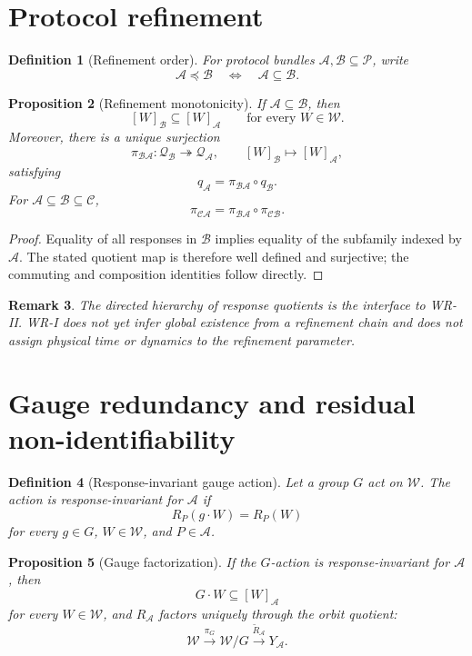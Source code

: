 \documentclass[11pt]{article}
\newtheorem{definition}{Definition}[section]
\newtheorem{proposition}[definition]{Proposition}
\newtheorem{remark}[definition]{Remark}
\newcommand{\W}{\mathcal W}
\newcommand{\Pcal}{\mathcal P}
\newcommand{\Acal}{\mathcal A}
\newcommand{\Bcal}{\mathcal B}
\begin{document}
\section{Protocol refinement}

\begin{definition}[Refinement order]
For protocol bundles $\Acal,\Bcal\subseteq\Pcal$, write
\[
\Acal\preceq\Bcal
\quad\Longleftrightarrow\quad
\Acal\subseteq\Bcal.
\]
\end{definition}

\begin{proposition}[Refinement monotonicity]\label{prop:refinement}
If $\Acal\subseteq\Bcal$, then
\[
[W]_{\Bcal}\subseteq[W]_{\Acal}
\qquad\text{for every }W\in\W.
\]
Moreover, there is a unique surjection
\[
\pi_{\Bcal\Acal}:\mathcal Q_{\Bcal}\twoheadrightarrow\mathcal Q_{\Acal},
\qquad
[W]_{\Bcal}\mapsto[W]_{\Acal},
\]
satisfying
\[
q_{\Acal}=\pi_{\Bcal\Acal}\circ q_{\Bcal}.
\]
For $\Acal\subseteq\Bcal\subseteq\mathcal C$,
\[
\pi_{\mathcal C\Acal}
=
\pi_{\Bcal\Acal}\circ\pi_{\mathcal C\Bcal}.
\]
\end{proposition}

\begin{proof}
Equality of all responses in $\Bcal$ implies equality of the subfamily indexed
by $\Acal$. The stated quotient map is therefore well defined and surjective;
the commuting and composition identities follow directly.
\end{proof}

\begin{remark}
The directed hierarchy of response quotients is the interface to WR-II. WR-I
does not yet infer global existence from a refinement chain and does not assign
physical time or dynamics to the refinement parameter.
\end{remark}

\section{Gauge redundancy and residual non-identifiability}

\begin{definition}[Response-invariant gauge action]
Let a group $G$ act on $\W$. The action is response-invariant for $\Acal$ if
\[
R_P(g\cdot W)=R_P(W)
\]
for every $g\in G$, $W\in\W$, and $P\in\Acal$.
\end{definition}

\begin{proposition}[Gauge factorization]\label{prop:gauge-factor}
If the $G$-action is response-invariant for $\Acal$, then
\[
G\cdot W\subseteq[W]_{\Acal}
\]
for every $W\in\W$, and $R_{\Acal}$ factors uniquely through the orbit quotient:
\[
\W\xrightarrow{\pi_G}\W/G
\xrightarrow{\widetilde R_{\Acal}}Y_{\Acal}.
\]
\end{proposition}
\end{document}
